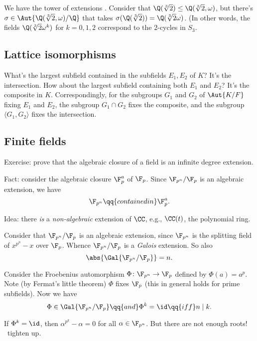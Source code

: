 We have the tower of extensions \TODO. Consider that
\(\Q(\sqrt[3]{2}) \le \Q(\sqrt[3]{2}, \omega)\), but there's
\(\sigma \in \Aut{\Q(\sqrt[3]{2}, \omega)/\Q}\) that takes
\(\sigma(\Q(\sqrt[3]{2})) = \Q(\sqrt[3]{2}\omega)\). (In other words,
the fields \(\Q(\sqrt[3]{2}\omega^k)\) for \(k = 0,1,2\) correspond to
the \(2\)-cycles in \(S_3\).

\hypertarget{lattice-isomorphisms}{%
\subsection{Lattice isomorphisms}\label{lattice-isomorphisms}}

What's the largest subfield contained in the subfields \(E_1, E_2\) of
\(K\)? It's the intersection. How about the largest subfield containing
both \(E_1\) and \(E_2\)? It's the composite in \(K\). Correspondingly,
for the subgroups \(G_1\) and \(G_2\) of \(\Aut{K/F}\) fixing \(E_1\)
and \(E_2\), the subgroup \(G_1 \cap G_2\) fixes the composite, and the
subgroup \(\langle G_1, G_2\rangle\) fixes the intersection. \TODO

\hypertarget{finite-fields}{%
\subsection{Finite fields}\label{finite-fields}}

Exercise: prove that the algebraic closure of a field is an infinite
degree extension.

Fact: consider the algebraic closure \(\F_p^a\) of \(\F_p\). Since
\(\F_{p^n}/\F_p\) is an algebraic extension, we have
\[\F_{p^n} \qq{ contained in } \F_p^a.\]

Idea: there \emph{is} a \emph{non-algebraic} extension of \(\CC\), e.g.,
\(\CC(t)\), the polynomial ring.

Consider that \(\F_{p^n}/\F_p\) is an algebraic extension, since
\(\F_{p^n}\) is the splitting field of \(x^{p^n} - x\) over \(\F_p\).
Whence \(\F_{p^n}/\F_p\) is a \emph{Galois} extension. So also
\[\abs{\Gal{\F_{p^n}/\F_p}} = n.\]

Consider the Froebenius automorphism \(\Phi\colon \F_{p^n} \to \F_p\)
defined by \(\Phi(a) = a^p\). Note (by Fermat's little theorem) \(\Phi\)
fixes \(\F_p\) (this in general holds for prime subfields). Now we have
\[\Phi \in \Gal{\F_{p^n}/\F_p} \qq{ and } \Phi^k = \id \qq{iff} n \mid k.\]

\pf If \(\Phi^k = \id\), then \(\alpha^{p^k} -\alpha = 0\) for all
\(\alpha \in \F_{p^n}\). But there are not enough roots! \TODO~tighten
up. \qedsymbol

